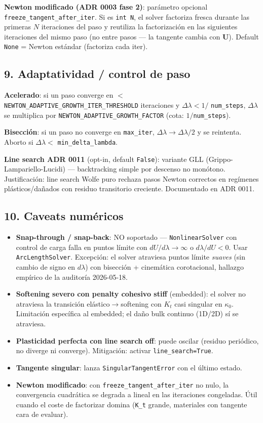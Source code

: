 \documentclass[11pt,letterpaper,oneside]{report}
\begin{document}
\textbf{Newton modificado (ADR 0003 fase 2)}: parámetro opcional \texttt{freeze\_tangent\_after\_iter}. Si es \texttt{int N}, el solver factoriza fresca durante las primeras $N$ iteraciones del paso y reutiliza la factorización en las siguientes iteraciones del mismo paso (no entre pasos --- la tangente cambia con $\mathbf U$). Default \texttt{None} = Newton estándar (factoriza cada iter).

\subsection{9. Adaptatividad / control de paso}

\textbf{Acelerado}: si un paso converge en $< $ \texttt{NEWTON\_ADAPTIVE\_GROWTH\_ITER\_THRESHOLD} iteraciones y $\Delta\lambda < 1/$ \texttt{num\_steps}, $\Delta\lambda$ se multiplica por \texttt{NEWTON\_ADAPTIVE\_GROWTH\_FACTOR} (cota: $1/$\texttt{num\_steps}).

\textbf{Bisección}: si un paso no converge en \texttt{max\_iter}, $\Delta\lambda \to \Delta\lambda / 2$ y se reintenta. Aborto si $\Delta\lambda < $ \texttt{min\_delta\_lambda}.

\textbf{Line search ADR 0011} (opt-in, default \texttt{False}): variante GLL (Grippo-Lampariello-Lucidi) --- backtracking simple por descenso no monótono. Justificación: line search Wolfe puro rechaza pasos Newton correctos en regímenes plásticos/dañados con residuo transitorio creciente. Documentado en ADR 0011.

\subsection{10. Caveats numéricos}

\begin{itemize}
  \item \textbf{Snap-through / snap-back}: NO soportado --- \texttt{NonlinearSolver} con control de carga falla en puntos límite con $dU/d\lambda \to \infty$ o $d\lambda/dU < 0$. Usar \texttt{ArcLengthSolver}. Excepción: el solver atraviesa puntos límite \textit{suaves} (sin cambio de signo en $d\lambda$) con bisección + cinemática corotacional, hallazgo empírico de la auditoría 2026-05-18.
  \item \textbf{Softening severo con penalty cohesivo stiff} (embedded): el solver no atraviesa la transición elástico\ensuremath{\to}softening con $K_t$ casi singular en $\kappa_0$. Limitación específica al embedded; el daño bulk continuo (1D/2D) sí se atraviesa.
  \item \textbf{Plasticidad perfecta con line search off}: puede oscilar (residuo periódico, no diverge ni converge). Mitigación: activar \texttt{line\_search=True}.
  \item \textbf{Tangente singular}: lanza \texttt{SingularTangentError} con el último estado.
  \item \textbf{Newton modificado}: con \texttt{freeze\_tangent\_after\_iter} no nulo, la convergencia cuadrática se degrada a lineal en las iteraciones congeladas. Útil cuando el coste de factorizar domina (\texttt{K\_t} grande, materiales con tangente cara de evaluar).
\end{itemize}
\end{document}
